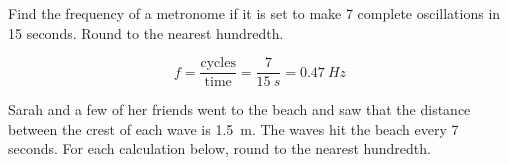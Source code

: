 \documentclass[]{exam}
\begin{document}
\begin{questions}

\question
Find the frequency of a metronome if it is set to make 7 complete oscillations in 15 seconds. Round to the nearest hundredth.

\begin{solution}
\begin{equation*}
    f = \frac{\text{cycles}}{\text{time}} = \frac{7}{\SI{15}{s}} = \boxed{\SI{0.47}{Hz}}
\end{equation*}
\end{solution}

\question
Sarah and a few of her friends went to the beach and saw that the distance between the crest of each wave is \SI{1.5}{m}. The waves hit the beach every 7 seconds. For each calculation below, round to the nearest hundredth.



\end{questions}
\end{document}
